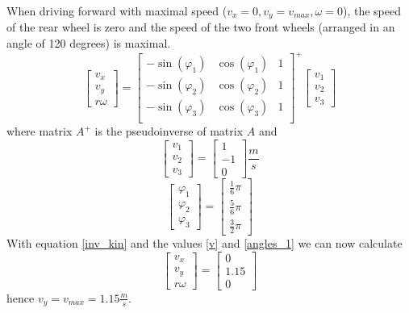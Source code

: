 \documentclass[paper=a4, fontsize=11pt]{scrartcl} %
\begin{document}
When driving forward with maximal speed ($ v_x = 0, v_y = v_{max}, \omega
= 0 $), the speed of the rear wheel is zero and the speed of the two front
wheels (arranged in an angle of 120 degrees) is maximal.
\begin{equation}
    \label{inv_kin}
    \begin{bmatrix}
        v_x\\
        v_y\\
        r \omega
    \end{bmatrix}
    = \begin{bmatrix}
        -\sin(\varphi_1) & \cos(\varphi_1) & 1\\
        -\sin(\varphi_2) & \cos(\varphi_2) & 1\\
        -\sin(\varphi_3) & \cos(\varphi_3) & 1\\
    \end{bmatrix}^+
    \begin{bmatrix}
        v_1\\
        v_2\\
        v_3
    \end{bmatrix}
\end{equation}
where matrix $ A^+ $ is the pseudoinverse of matrix $ A $ and
\begin{equation}
    \label{v}
    \begin{bmatrix}
        v_1\\
        v_2\\
        v_3
    \end{bmatrix}
    = \begin{bmatrix}
        1\\
        -1\\
        0
    \end{bmatrix} \frac{m}{s}
\end{equation}
\begin{equation}
    \label{angles_1}
    \begin{bmatrix}
        \varphi_1\\
        \varphi_2\\
        \varphi_3
    \end{bmatrix}
    = \begin{bmatrix}
        \frac{1}{6}\pi\\
        \frac{5}{6}\pi\\
        \frac{3}{2}\pi
    \end{bmatrix}
\end{equation}
With equation \ref{inv_kin} and the values \ref{v} and \ref{angles_1} we can now calculate
\begin{equation}
    \begin{bmatrix}
        v_x\\
        v_y\\
        r \omega
    \end{bmatrix}
    = \begin{bmatrix}
        0\\
        1.15\\
        0
    \end{bmatrix}
\end{equation}
hence $ v_y = v_{max} = 1.15 \frac{m}{s}$.
\end{document}
